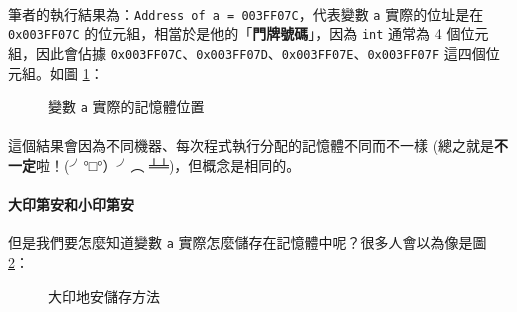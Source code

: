 \documentclass[12pt,a4paper,oneside]{article}
\begin{document}
\begin{CJK}{UTF8}{bkai}
\paragraph{}筆者的執行結果為：\lstinline!Address of a = 003FF07C!，代表變數 \lstinline!a! 實際的位址是在 \lstinline!0x003FF07C! 的位元組，相當於是他的「\textbf{門牌號碼}」，因為 \lstinline!int! 通常為 4 個位元組，因此會佔據 \lstinline!0x003FF07C!、\lstinline!0x003FF07D!、\lstinline!0x003FF07E!、\lstinline!0x003FF07F! 這四個位元組。如圖 \ref{program:struct:fig:int:address}：

\begin{figure}[h!]
\centering
{}
\caption{變數 \lstinline!a! 實際的記憶體位置}
\label{program:struct:fig:int:address}
\end{figure}

\paragraph{}這個結果會因為不同機器、每次程式執行分配的記憶體不同而不一樣 (總之就是\textbf{不一定}啦！(╯°□°）╯︵ ╧╧)，但概念是相同的。

\paragraph{大印第安和小印第安}但是我們要怎麼知道變數 \lstinline!a! 實際怎麼儲存在記憶體中呢？很多人會以為像是圖 \ref{program:struct:fig:big:endian}：

\begin{figure}[h!]
\centering
{}
\caption{大印地安儲存方法}
\label{program:struct:fig:big:endian}
\end{figure}


\end{CJK}
\end{document}

